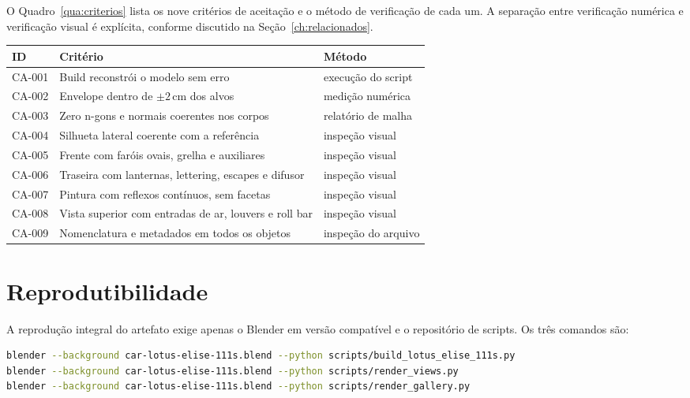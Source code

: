 O Quadro~\ref{qua:criterios} lista os nove crit\'erios de aceita{\c{c}}\~ao e o m\'etodo de
verifica{\c{c}}\~ao de cada um. A separa{\c{c}}\~ao entre verifica{\c{c}}\~ao num\'erica e
verifica{\c{c}}\~ao visual \'e expl\'icita, conforme discutido na
Se{\c{c}}\~ao~\ref{ch:relacionados}.

\begin{quadro}[htbp]
\centering
\caption{Crit\'erios de aceita{\c{c}}\~ao e m\'etodo de verifica{\c{c}}\~ao}
\label{qua:criterios}
\footnotesize
\begin{tabular}{>{\raggedright\arraybackslash}p{1.3cm}>{\raggedright\arraybackslash}p{8.0cm}>{\raggedright\arraybackslash}p{4.5cm}}
\toprule
\textbf{ID} & \textbf{Crit\'erio} & \textbf{M\'etodo} \\
\midrule
CA-001 & Build reconstr\'oi o modelo sem erro & execu{\c{c}}\~ao do script \\
CA-002 & Envelope dentro de $\pm2$\,cm dos alvos & medi{\c{c}}\~ao num\'erica \\
CA-003 & Zero n-gons e normais coerentes nos corpos & relat\'orio de malha \\
CA-004 & Silhueta lateral coerente com a refer\^encia & inspe{\c{c}}\~ao visual \\
CA-005 & Frente com far\'ois ovais, grelha e auxiliares & inspe{\c{c}}\~ao visual \\
CA-006 & Traseira com lanternas, lettering, escapes e difusor & inspe{\c{c}}\~ao visual \\
CA-007 & Pintura com reflexos cont\'inuos, sem facetas & inspe{\c{c}}\~ao visual \\
CA-008 & Vista superior com entradas de ar, louvers e roll bar & inspe{\c{c}}\~ao visual \\
CA-009 & Nomenclatura e metadados em todos os objetos & inspe{\c{c}}\~ao do arquivo \\
\bottomrule
\end{tabular}
\end{quadro}

\section{Reprodutibilidade}

A reprodu{\c{c}}\~ao integral do artefato exige apenas o Blender em vers\~ao compat\'ivel e o
reposit\'orio de scripts. Os tr\^es comandos s\~ao:

\begin{lstlisting}[language=bash]
blender --background car-lotus-elise-111s.blend --python scripts/build_lotus_elise_111s.py
blender --background car-lotus-elise-111s.blend --python scripts/render_views.py
blender --background car-lotus-elise-111s.blend --python scripts/render_gallery.py
\end{lstlisting}

